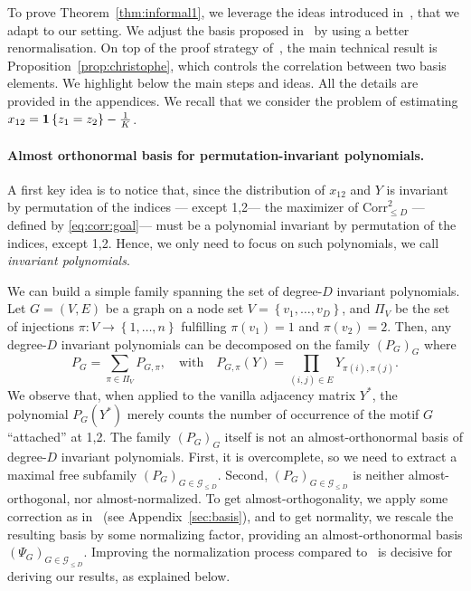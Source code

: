 \documentclass[final]{colt2026}
\newcommand{\1}{\mathbf{1}}
\newcommand{\ac}[1]{\left\{#1\right\}}
\begin{document}
To prove Theorem~\ref{thm:informal1},  we leverage the ideas introduced in~\cite{CGGV25}, that we adapt to our setting.
 We adjust the basis proposed in~\cite{CGGV25} by using a better renormalisation. On top of the proof strategy of~\cite{CGGV25}, the main technical result is Proposition~\ref{prop:christophe}, which controls the correlation between two basis elements.
We highlight below the main steps and ideas. All the details are provided in the appendices. We recall that we consider the problem of estimating $x_{12}={\bf 1}\ac{z_{1}=z_{2}}-{1\over K}$. 

\paragraph{Almost orthonormal basis for permutation-invariant polynomials.}
A first key idea is to notice that, since the distribution of $x_{12}$ and $Y$ is invariant by permutation of the indices --- except 1,2--- the maximizer of $\mathrm{Corr}^2_{\leq D}$ ---defined by \eqref{eq:corr:goal}---  must be a polynomial  invariant by permutation of the indices,  except 1,2. Hence, we only need to focus on such polynomials, we call \emph{invariant polynomials}.

We can build a simple family spanning the set of degree-$D$ invariant polynomials. Let $G=(V,E)$ be a graph on a node set $V=\ac{v_{1},\ldots,v_{D}}$, and 
$\Pi_{V}$ be the set of injections $\pi:V\to \ac{1,\ldots,n}$ fulfilling $\pi(v_{1})=1$ and $\pi(v_{2})=2$. Then, any degree-$D$ invariant polynomials can be decomposed on the family $(P_{G})_{G}$ where
$$P_G = \sum_{\pi\in \Pi_V} P_{G,\pi},\quad \text{with} \quad P_{G,\pi}(Y)= \prod_{(i,j)\in E} Y_{\pi(i),\pi(j)} .$$
We observe that, when applied to the vanilla adjacency matrix $Y^*$, the polynomial $P_{G}(Y^*)$ merely counts  the number of occurrence of the motif $G$ ``attached'' at 1,2. The family $(P_{G})_{G}$ itself is not an almost-orthonormal basis of degree-$D$ invariant polynomials. First, it is overcomplete, so we need to extract a maximal free subfamily $(P_{G})_{G\in \mathcal{G}_{\leq D}}$. Second, $(P_{G})_{G\in \mathcal{G}_{\leq D}}$ is neither almost-orthogonal, nor almost-normalized. To get almost-orthogonality, we apply some correction as in~\cite{CGGV25} (see Appendix~\ref{sec:basis}), and to get normality, we rescale the resulting basis by some normalizing factor, providing an almost-orthonormal basis $(\Psi_{G})_{G\in \mathcal{G}_{\leq D}}$. Improving the normalization process compared to~\cite{CGGV25} is decisive for deriving our results, as explained below.
\end{document}
